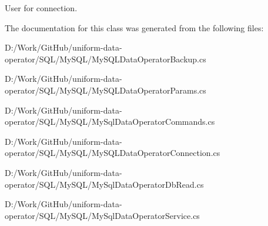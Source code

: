 User for connection. 



The documentation for this class was generated from the following files\+:\begin{DoxyCompactItemize}
\item 
D\+:/\+Work/\+Git\+Hub/uniform-\/data-\/operator/\+S\+Q\+L/\+My\+S\+Q\+L/My\+S\+Q\+L\+Data\+Operator\+Backup.\+cs\item 
D\+:/\+Work/\+Git\+Hub/uniform-\/data-\/operator/\+S\+Q\+L/\+My\+S\+Q\+L/My\+S\+Q\+L\+Data\+Operator\+Params.\+cs\item 
D\+:/\+Work/\+Git\+Hub/uniform-\/data-\/operator/\+S\+Q\+L/\+My\+S\+Q\+L/My\+Sql\+Data\+Operator\+Commands.\+cs\item 
D\+:/\+Work/\+Git\+Hub/uniform-\/data-\/operator/\+S\+Q\+L/\+My\+S\+Q\+L/My\+S\+Q\+L\+Data\+Operator\+Connection.\+cs\item 
D\+:/\+Work/\+Git\+Hub/uniform-\/data-\/operator/\+S\+Q\+L/\+My\+S\+Q\+L/My\+Sql\+Data\+Operator\+Db\+Read.\+cs\item 
D\+:/\+Work/\+Git\+Hub/uniform-\/data-\/operator/\+S\+Q\+L/\+My\+S\+Q\+L/My\+Sql\+Data\+Operator\+Service.\+cs\end{DoxyCompactItemize}
